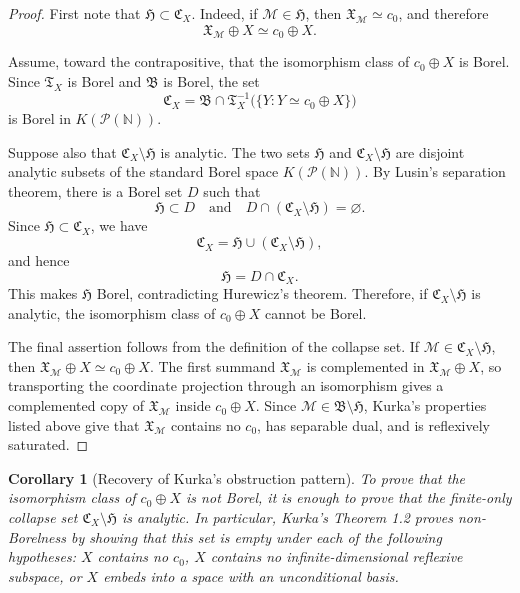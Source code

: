 \documentclass[11pt]{article}
\newtheorem*{corollary}{Corollary}
\begin{document}
\begin{proof}
First note that \(\mathfrak H\subset \mathfrak C_X\).  Indeed, if \(\mathcal M\in\mathfrak H\), then \(\mathfrak X_{\mathcal M}\simeq c_0\), and therefore
\[
  \mathfrak X_{\mathcal M}\oplus X\simeq c_0\oplus X.
\]

Assume, toward the contrapositive, that the isomorphism class of \(c_0\oplus X\) is Borel.  Since \(\mathfrak T_X\) is Borel and \(\mathfrak B\) is Borel, the set
\[
  \mathfrak C_X
  =
  \mathfrak B\cap
  \mathfrak T_X^{-1}\bigl(\{Y:Y\simeq c_0\oplus X\}\bigr)
\]
is Borel in \(K(\mathcal P(\mathbb N))\).

Suppose also that \(\mathfrak C_X\setminus\mathfrak H\) is analytic.  The two sets \(\mathfrak H\) and \(\mathfrak C_X\setminus\mathfrak H\) are disjoint analytic subsets of the standard Borel space \(K(\mathcal P(\mathbb N))\).  By Lusin's separation theorem, there is a Borel set \(D\) such that
\[
  \mathfrak H\subset D
  \quad\text{and}\quad
  D\cap(\mathfrak C_X\setminus\mathfrak H)=\varnothing.
\]
Since \(\mathfrak H\subset\mathfrak C_X\), we have
\[
  \mathfrak C_X=\mathfrak H\cup(\mathfrak C_X\setminus\mathfrak H),
\]
and hence
\[
  \mathfrak H=D\cap\mathfrak C_X.
\]
This makes \(\mathfrak H\) Borel, contradicting Hurewicz's theorem.  Therefore, if \(\mathfrak C_X\setminus\mathfrak H\) is analytic, the isomorphism class of \(c_0\oplus X\) cannot be Borel.

The final assertion follows from the definition of the collapse set.  If \(\mathcal M\in\mathfrak C_X\setminus\mathfrak H\), then \(\mathfrak X_{\mathcal M}\oplus X\simeq c_0\oplus X\).  The first summand \(\mathfrak X_{\mathcal M}\) is complemented in \(\mathfrak X_{\mathcal M}\oplus X\), so transporting the coordinate projection through an isomorphism gives a complemented copy of \(\mathfrak X_{\mathcal M}\) inside \(c_0\oplus X\).  Since \(\mathcal M\in\mathfrak B\setminus\mathfrak H\), Kurka's properties listed above give that \(\mathfrak X_{\mathcal M}\) contains no \(c_0\), has separable dual, and is reflexively saturated.
\end{proof}

\begin{corollary}[Recovery of Kurka's obstruction pattern]
To prove that the isomorphism class of \(c_0\oplus X\) is not Borel, it is enough to prove that the finite-only collapse set \(\mathfrak C_X\setminus\mathfrak H\) is analytic.  In particular, Kurka's Theorem 1.2 proves non-Borelness by showing that this set is empty under each of the following hypotheses: \(X\) contains no \(c_0\), \(X\) contains no infinite-dimensional reflexive subspace, or \(X\) embeds into a space with an unconditional basis.
\end{corollary}
\end{document}
